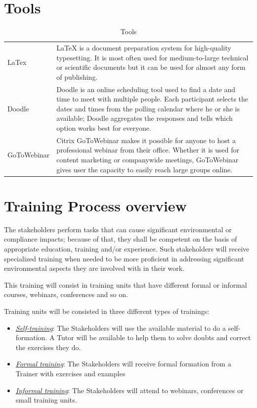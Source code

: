 \documentclass{template/openetcs_article}
\begin{document}
\section{Tools}

\begin{table}[H]
\begin{tabular}{|m{3cm}|m{11cm}|}
\hline
\rowcolor{myblue}
\multicolumn{2}{|c|}{Tools} \\\hline
LaTex &
LaTeX is a document preparation system for high-quality typesetting. It is most often used for medium-to-large technical or scientific documents but it can be used for almost any form of publishing.\\\hline
Doodle &
Doodle is an online scheduling tool used to find a date and time to meet with multiple people. Each participant selects the dates and times from the polling calendar where he or she is available; Doodle aggregates the responses and tells which option works best for everyone.\\\hline
GoToWebinar &
Citrix GoToWebinar makes it possible for anyone to host a professional webinar from their office. Whether it is used for content marketing or companywide meetings, GoToWebinar gives user the capacity to easily reach large groups online.\\\hline
\end{tabular}
\caption{Tools}
\end{table}

\section{Training Process overview}

The stakeholders perform tasks that can cause significant environmental or compliance impacts; because of that, they shall be competent on the basis of appropriate education, training and/or experience. Such stakeholders will receive specialized training when needed to be more proficient in addressing significant environmental aspects they are involved with in their work. 

This training will consist in training units that have different formal or informal courses, webinars, conferences and so on.

Training units will be consisted in three different types of trainings:
\begin{itemize}
\item \underline{\it Self-training}: The Stakeholders will use the available material to do a self-formation. A Tutor will be available to help them to solve doubts and correct the exercises they do.
\item \underline{\it Formal training}: The Stakeholders will receive formal formation from a Trainer with exercises and examples
\item \underline{\it Informal training}: The Stakeholders will attend to webinars, conferences or small training units.
\end{itemize}
\end{document}
